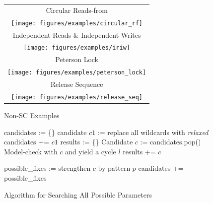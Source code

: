 \begin{figure}[!ht]
\centering
\begin{tabular}{c}
\multicolumn{1}{c}{Circular Reads-from}\\
\texttt{[image: figures/examples/circular\_rf]}\\
\multicolumn{1}{c}{Independent Reads \& Independent Writes}\\
\texttt{[image: figures/examples/iriw]}\\
\multicolumn{1}{c}{Peterson Lock}\\
\texttt{[image: figures/examples/peterson\_lock]}\\
\multicolumn{1}{c}{Release Sequence}\\
\texttt{[image: figures/examples/release\_seq]}\\
\end{tabular}
\caption{\label{fig:fence_implications}Non-SC Examples}
\end{figure}

\begin{figure}[!htbp]
\begin{algorithmic}[1]
\State candidates := \{\}
\State candidate $c1$ := replace all wildcards with \textit{relaxed}
\State candidates += $c1$
\State results := \{\}
\State Candidate $c$ := candidates.pop()
\State Model-check with $c$ and yield a cycle $l$
\State results += $c$
\Else
\State {}
\EndIf
\EndWhile
\State {}
\EndFunction

\State possible\_fixes := strengthen $c$ by pattern $p$
\State candidates += possible\_fixes 
\EndWhile
\EndProcedure

\end{algorithmic}
\caption{\label{fig:algorithm}Algorithm for Searching All Possible Parameters}
\end{figure}

